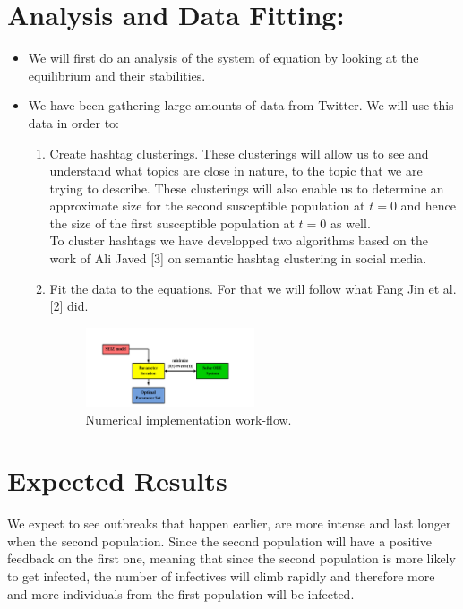\documentclass{article}
\begin{document}
\section{Analysis and Data Fitting:}
\begin{itemize}
\item We will first do an analysis of the system of equation by looking at the equilibrium and their stabilities. 
\item We have been gathering large amounts of data from Twitter. We will use this data in order to:
\begin{enumerate}
\item Create hashtag clusterings. These clusterings will allow us to see and understand what topics are close in nature, to the topic that we are trying to describe. These clusterings will also enable us to determine an approximate size for the second susceptible population at $t=0$ and hence the size of the first susceptible population at $t=0$ as well.
\\To cluster hashtags we have developped two algorithms based on the work of Ali Javed [3] on semantic hashtag clustering in social media. 
\item Fit the data to the equations. For that we will follow what Fang Jin et al. [2] did. \\
\begin{figure}[h]
\centering
\includegraphics[width=0.5\textwidth]{workflow.png}
\caption{Numerical implementation work-flow.}
\end{figure}

\end{enumerate}

\end{itemize}
\section{Expected Results}
We expect to see outbreaks that happen earlier, are more intense and last longer when the second population. Since the second population will have a positive feedback on the first one, meaning that since the second population is more likely to get infected, the number of infectives will climb rapidly and therefore more and more individuals from the first population will be infected.
\end{document}
